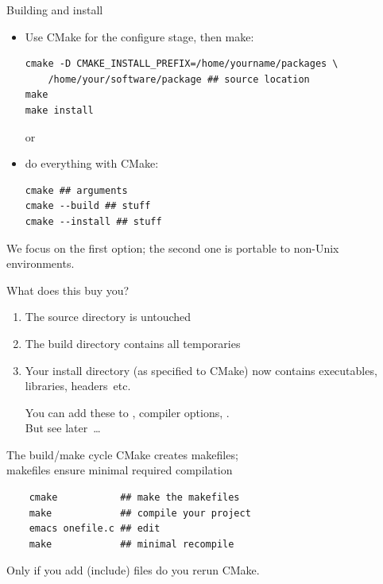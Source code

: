 \begin{numberedframe}{Building and install}
  \begin{itemize}
  \item Use CMake for the configure stage, then make:
\begin{lstlisting}
cmake -D CMAKE_INSTALL_PREFIX=/home/yourname/packages \
    /home/your/software/package ## source location
make
make install
\end{lstlisting}
or
  \item do everything with CMake:
\begin{lstlisting}
cmake ## arguments
cmake --build ## stuff
cmake --install ## stuff
\end{lstlisting}
  \end{itemize}
  We focus on the first option;
  the second one is portable to non-Unix environments.
\end{numberedframe}

\begin{numberedframe}{What does this buy you?}
  \begin{enumerate}
  \item The source directory is untouched
  \item The build directory contains all temporaries
  \item 
    Your install directory (as specified to CMake)
    now contains executables, libraries, headers~etc.

  You can add these to , compiler options,
  .\\
  But see later~\ldots
  \end{enumerate}
\end{numberedframe}

\begin{numberedframe}{The build/make cycle}
  CMake creates makefiles;\\
  makefiles ensure minimal required compilation
  \begin{lstlisting}
    cmake           ## make the makefiles
    make            ## compile your project
    emacs onefile.c ## edit
    make            ## minimal recompile
  \end{lstlisting}
  Only if you add (include) files do you rerun CMake.
\end{numberedframe}

